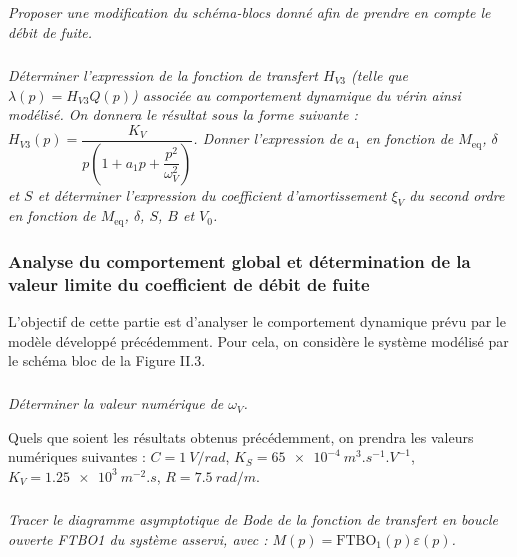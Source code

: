 \documentclass[10pt,fleqn]{article} %
\begin{document}
\begin{multicols}{2}
\subparagraph{}\textit{Proposer une modification du schéma-blocs donné afin de prendre en compte le débit de fuite.}
\ifprof
\begin{corrige}
\begin{center}
\end{center}
\end{corrige}
\else
\fi
\begin{center}
\end{center}


\subparagraph{}\textit{Déterminer l'expression de la fonction de transfert $H_{V3}$ (telle que $\lambda(p) =  H_{V3} Q(p)$) associée au comportement dynamique du vérin ainsi modélisé. On donnera le résultat sous la forme suivante : 
$H_{V3}(p)=\dfrac{K_V}{p\left(1+a_1 p + \dfrac{p^2}{\omega_V^2} \right)}$.  
Donner l'expression de $a_1$ en fonction de $M_{\text{eq}}$, $\delta$ et $S$ et déterminer l'expression du coefficient d'amortissement $\xi_V$ du second ordre en fonction de $M_{\text{eq}}$, $\delta$, $S$, $B$ et $V_0$.}
\ifprof
\begin{corrige}
\begin{center}
\end{center}
\end{corrige}
\else
\fi

\subsubsection*{Analyse du comportement global et détermination de la valeur limite du coefficient de débit de fuite}


L'objectif de cette partie est d'analyser le comportement dynamique prévu par le modèle développé précédemment. Pour cela, on considère le système modélisé par le schéma bloc de la Figure II.3.

\subparagraph{}\textit{Déterminer la valeur numérique de $\omega_V$.}
\ifprof
\begin{corrige}
\end{corrige}
\else
\fi


Quels que soient les résultats obtenus précédemment, on prendra les valeurs numériques suivantes :
$C = \SI{1}{V/rad}$, $K_S = \SI{65e-4}{m^3.s^{-1}.V^{-1}}$, $K_V = \SI{1,25e3}{m^{-2}.s}$, $R = \SI{7,5}{rad/m}.$


\subparagraph{}\textit{Tracer le diagramme asymptotique de Bode de la fonction de transfert en boucle ouverte FTBO1 du système asservi, avec : $M(p)=\text{FTBO}_1(p) \varepsilon(p)$.}
\ifprof
\begin{corrige}
\end{corrige}
\else
\fi


\end{multicols}
\end{document}
